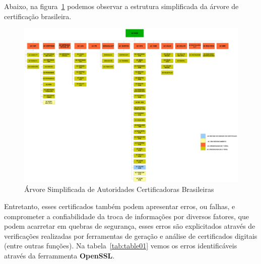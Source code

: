 	Abaixo, na figura~\ref{fig:img08} podemos observar a estrutura simplificada da árvore de certificação brasileira.

	\begin{figure}[!ht]
		\centering
		\includegraphics[keepaspectratio=true,scale=0.7]{figuras/certBR.eps}
		\caption{Árvore Simplificada de Autoridades Certificadoras Brasileiras \cite{itiICPBRASIL}}
		\label{fig:img08}
	\end{figure}

	Entretanto, esses certificados também podem apresentar erros, ou falhas, e comprometer a confiabilidade da troca de informações por diversos fatores, que podem acarretar em quebras de segurança, esses erros são explicitados através de verificações realizadas por ferramentas de geração e análise de certificados digitais (entre outras funções). Na tabela~\ref{tab:table01} vemos os erros identificáveis através da ferrammenta \textbf{OpenSSL}. 

